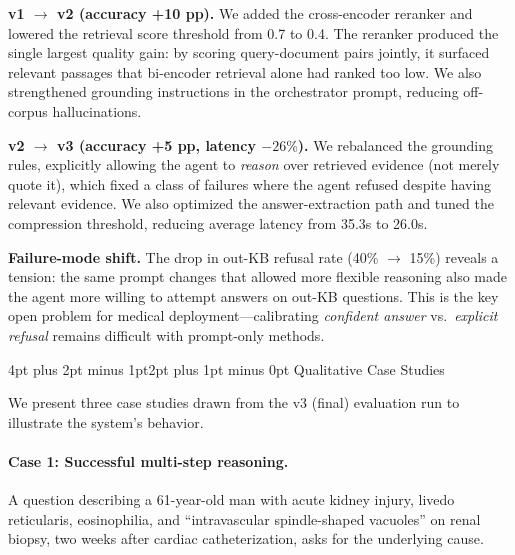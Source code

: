 \documentclass[10pt,twocolumn,letterpaper]{article}
\makeatletter
\renewcommand\subsection{\@startsection{subsection}{2}{\z@}%
  {4pt plus 2pt minus 1pt}{2pt plus 1pt minus 0pt}%
  {\normalsize\bfseries}}
\makeatother
\begin{document}
\textbf{v1 $\to$ v2 (accuracy +10 pp).} We added the cross-encoder reranker and lowered the retrieval score threshold from 0.7 to 0.4. The reranker produced the single largest quality gain: by scoring query-document pairs jointly, it surfaced relevant passages that bi-encoder retrieval alone had ranked too low. We also strengthened grounding instructions in the orchestrator prompt, reducing off-corpus hallucinations.

\textbf{v2 $\to$ v3 (accuracy +5 pp, latency $-26\%$).} We rebalanced the grounding rules, explicitly allowing the agent to \emph{reason} over retrieved evidence (not merely quote it), which fixed a class of failures where the agent refused despite having relevant evidence. We also optimized the answer-extraction path and tuned the compression threshold, reducing average latency from 35.3s to 26.0s.

\textbf{Failure-mode shift.} The drop in out-KB refusal rate (40\% $\to$ 15\%) reveals a tension: the same prompt changes that allowed more flexible reasoning also made the agent more willing to attempt answers on out-KB questions. This is the key open problem for medical deployment---calibrating \emph{confident answer} vs.\ \emph{explicit refusal} remains difficult with prompt-only methods.

\subsection{Qualitative Case Studies}

We present three case studies drawn from the v3 (final) evaluation run to illustrate the system's behavior.

\paragraph{Case 1: Successful multi-step reasoning.}
A question describing a 61-year-old man with acute kidney injury, livedo reticularis, eosinophilia, and ``intravascular spindle-shaped vacuoles'' on renal biopsy, two weeks after cardiac catheterization, asks for the underlying cause.
\end{document}
